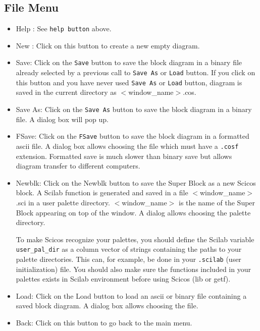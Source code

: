 \subsection{File Menu}
\begin{itemize}
\item {Help :} See {\tt help button} above.
\item {New :} Click on this button to create a new empty diagram.
\item {Save:} Click on the {\tt Save} button to save the block diagram
  in a binary file already selected by a previous call to {\tt Save
    As} or {\tt Load} button. If you click on this button and you have
  never used {\tt Save As} or {\tt Load} button, diagram is saved in
  the current directory as $<$window\_name$>$.cos.
\item {Save As:} Click on the {\tt Save As} button to save the block diagram
  in a binary file. A dialog box will pop up. 
\item {FSave:} Click on the {\tt FSave} button to save the block diagram
  in a formatted ascii file. A dialog box allows choosing the file
  which must have a {\tt .cosf} extension. Formatted save is much
  slower than binary save but allows diagram transfer to different computers.

\item {Newblk:} Click on the Newblk button to save the Super Block as
  a new Scicos block. A Scilab function is generated and saved in a
  file $<$window\_name$>$.sci in a user palette directory.
  $<$window\_name$>$ is
  the name of the Super Block appearing on top of the window.  A
  dialog allows choosing the palette directory.

  To make Scicos recognize your palettes, you should define the Scilab
  variable {\tt user\_pal\_dir} as a column vector of strings containing the
  paths to your palette directories. This can, for example, be done in
  your {\tt .scilab} (user initialization) file.  You should also make sure
  the functions included in your palettes exists in Scilab environment
  before using Scicos (lib or getf).

\item {Load:} Click on the Load button to load an ascii or binary file
containing a saved block diagram.  A dialog box allows choosing the
file.
\item {Back:} Click on this button to go back to the main menu.
\end{itemize}
